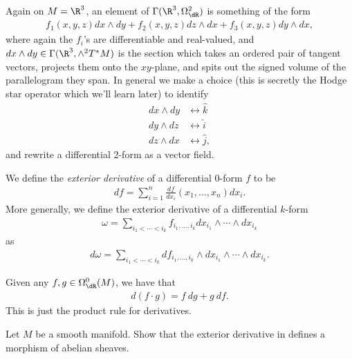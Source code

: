 \documentclass[11pt]{book}
\begin{document}
\begin{example}\label{exa:2-form-R3-vector-field} 
Again on $M = \R^3$, an element of $\Gamma(\R^3,\Omega^2_\dR)$ is something of the form
\begin{align*}
    f_1(x,y,z) dx \wedge dy + f_2(x,y,z) dz\wedge dx + f_3(x,y,z) dy\wedge dx,
\end{align*}
where again the $f_i$'s are differentiable and real-valued, and $dx\wedge dy \in \Gamma(\R^3, \wedge^2 T^\ast M)$ is the section which takes an ordered pair of tangent vectors, projects them onto the $xy$-plane, and spits out the signed volume of the parallelogram they span. In general we make a choice (this is secretly the Hodge star operator which we'll learn later) to identify
\begin{align*}
    dx\wedge dy &\leftrightarrow \hat{k} \\
    dy \wedge dz & \leftrightarrow \hat{i} \\
    dz\wedge dx &\leftrightarrow \hat{j},
\end{align*}
and rewrite a differential 2-form as a vector field.
\end{example}

\begin{definition}\label{def:exterior-derivative} 
We define the \emph{exterior derivative} of a differential $0$-form $f$ to be
\begin{align*}
    df = \sum_{i=1}^n \frac{df}{dx_i}(x_1, \ldots, x_n) dx_i.
\end{align*}
More generally, we define the exterior derivative of a differential $k$-form
\begin{align*}
    \omega = \sum_{i_1 < \cdots < i_k}f_{i_1, \ldots, i_k}dx_{i_1}\wedge \cdots \wedge dx_{i_k}
\end{align*}
as
\begin{align*}
    d\omega = \sum_{i_1< \cdots < i_k} df_{i_1, \ldots, i_k} \wedge dx_{i_1}\wedge \cdots \wedge dx_{i_k}.
\end{align*}
\end{definition}

\begin{remark} Given any $f,g\in \Omega^0_\dR(M)$, we have that
\begin{align*}
    d (f\cdot g) = f\ dg + g\ df.
\end{align*}
This is just the product rule for derivatives.
\end{remark}



\begin{exercise}
Let $M$ be a smooth manifold. Show that the exterior derivative in  defines a morphism of abelian sheaves.
\end{exercise}
\end{document}
